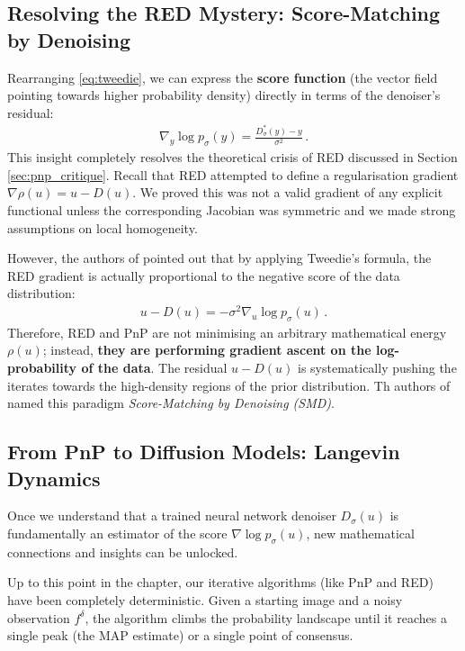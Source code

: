 \subsection{Resolving the RED Mystery: Score-Matching by Denoising} 
Rearranging \eqref{eq:tweedie}, we can express the \textbf{score function} (the vector field pointing towards higher probability density) directly in terms of the denoiser's residual:
\begin{align}
    \nabla_y \log p_\sigma(y) = \frac{D_\sigma^*(y) - y}{\sigma^2} \, .
    \label{eq:score_denoiser}
\end{align}
This insight completely resolves the theoretical crisis of RED discussed in Section \ref{sec:pnp_critique}. Recall that RED attempted to define a regularisation gradient $\nabla \rho(u) = u - D(u)$. We proved this was not a valid gradient of any explicit functional unless the corresponding Jacobian was symmetric and we made strong assumptions on local homogeneity.

However, the authors of \cite{reehorst2018regularization} pointed out that by applying Tweedie's formula, the RED gradient is actually proportional to the negative score of the data distribution:
\begin{align*}
    u - D(u) = -\sigma^2 \nabla_u \log p_\sigma(u) \, .
\end{align*}
Therefore, RED and PnP are not minimising an arbitrary mathematical energy $\rho(u)$; instead, \textbf{they are performing gradient ascent on the log-probability of the data}. The residual $u - D(u)$ is systematically pushing the iterates towards the high-density regions of the prior distribution. Th authors of \cite{reehorst2018regularization} named this paradigm \emph{Score-Matching by Denoising (SMD)}.

\subsection{From PnP to Diffusion Models: Langevin Dynamics}

Once we understand that a trained neural network denoiser $D_\sigma(u)$ is fundamentally an estimator of the score $\nabla \log p_\sigma(u)$, new mathematical connections and insights can be unlocked. 

Up to this point in the chapter, our iterative algorithms (like PnP and RED) have been completely deterministic. Given a starting image and a noisy observation $f^\delta$, the algorithm climbs the probability landscape until it reaches a single peak (the MAP estimate) or a single point of consensus. 


